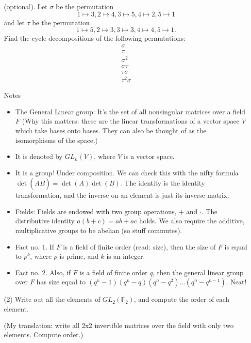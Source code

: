\documentclass[1    0pt, answers]{exam} \renewcommand{\baselinestretch}{1.05}
\theoremstyle{plain}
\theoremstyle{definition}
\begin{document}
\begin{questions}
\question (optional). Let $\sigma$ be the permutation
\[ 1 \mapsto 3, 2 \mapsto 4, 3 \mapsto 5, 4 \mapsto 2, 5 \mapsto 1 \]
and let $\tau$ be the permutation
\[ 1 \mapsto 5, 2 \mapsto 3, 3 \mapsto 3, 4 \mapsto 4, 5 \mapsto 1. \]
Find the cycle decompositions of the following permutations:
\begin{align*}
\sigma \\
\tau \\
\sigma^2 \\
\sigma \tau \\
\tau \sigma \\
\tau^2 \sigma
\end{align*}

\begin{solution}
\end{solution}

Notes
\begin{itemize}
    \item The General Linear group: It's the set of all nonsingular matrices over a field $F$ (Why this matters: these are the linear transformations of a vector space $V$ which take bases onto bases. They can also be thought of as the isomorphisms of the space.)
    \item It is denoted by $GL_n(V)$, where $V$ is a vector space.
    \item It is a group! Under composition. We can check this with the nifty formula $\det(A \dot B) = \det(A) \det(B)$. The identity is the identity transformation, and the inverse on an element is just its inverse matrix.
    \item Fields: Fields are endowed with two group operations, $+$ and $\cdot$. The distributive identity $a(b + c) = ab + ac$ holds. We also require the additive, multiplicative groups to be abelian (so stuff commutes).
    \item Fact no. 1. If $F$ is a field of finite order (read: size), then the size of $F$ is equal to $p^k$, where $p$ is prime, and $k$ is an integer.
    \item Fact no. 2. Also, if $F$ is a field of finite order $q$, then the general linear group over $F$ has size equal to $(q^n - 1)(q^n - q)(q^n - q^2)\ldots(q^n - q^{n-1})$. Neat!
\end{itemize}

\question (2) Write out all the elements of $GL_2(\mathbb{F}_2)$, and compute the order of each element.

(My translation: write all 2x2 invertible matrices over the field with only two elements. Compute order.)


\end{questions}
\end{document}
